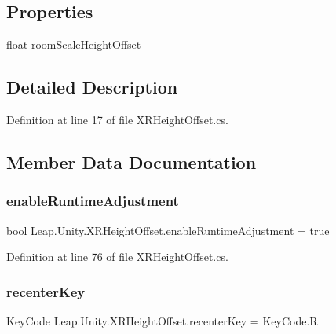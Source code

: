 \subsection*{Properties}
\begin{DoxyCompactItemize}
\item 
float \mbox{\hyperlink{class_leap_1_1_unity_1_1_x_r_height_offset_a1e2ab3d404c464995b8686af7ef82af8}{room\+Scale\+Height\+Offset}}
\end{DoxyCompactItemize}


\subsection{Detailed Description}


Definition at line 17 of file X\+R\+Height\+Offset.\+cs.



\subsection{Member Data Documentation}
\mbox{\label{class_leap_1_1_unity_1_1_x_r_height_offset_a160ba995082678c7cd11b8bd6ba6bdf6}} 
\subsubsection{\texorpdfstring{enableRuntimeAdjustment}{enableRuntimeAdjustment}}
{\footnotesize\ttfamily bool Leap.\+Unity.\+X\+R\+Height\+Offset.\+enable\+Runtime\+Adjustment = true}



Definition at line 76 of file X\+R\+Height\+Offset.\+cs.

\mbox{\label{class_leap_1_1_unity_1_1_x_r_height_offset_ab8fb43ee2bb8f789f5868ed4d64f1a1e}} 
\subsubsection{\texorpdfstring{recenterKey}{recenterKey}}
{\footnotesize\ttfamily Key\+Code Leap.\+Unity.\+X\+R\+Height\+Offset.\+recenter\+Key = Key\+Code.\+R}



